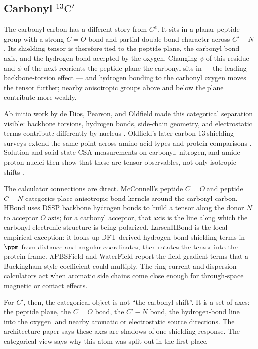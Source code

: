 \documentclass[11pt]{article}
\begin{document}
\subsection{\texorpdfstring{Carbonyl \(^{13}\mathrm C'\)}
{Carbonyl 13C-prime}}

The carbonyl carbon has a different story from \(C^\alpha\). It sits in a
planar peptide group with a strong \(C=O\) bond and partial double-bond
character across \(C'-N\). Its shielding tensor is therefore tied to the peptide
plane, the carbonyl bond axis, and the hydrogen bond accepted by the oxygen.
Changing \(\psi\) of this residue and \(\phi\) of the next reorients the
peptide plane the carbonyl sits in --- the leading backbone-torsion effect ---
and hydrogen bonding to the carbonyl oxygen moves the tensor further; nearby
anisotropic groups above and below the plane contribute more weakly.

Ab initio work by de Dios, Pearson, and Oldfield made this categorical
separation visible: backbone torsions, hydrogen bonds, side-chain geometry, and
electrostatic terms contribute differently by nucleus \cite{dedios1993}.
Oldfield's later carbon-13 shielding surveys extend the same point across amino
acid types and protein comparisons \cite{oldfield1995,sun2002}. Solution and
solid-state CSA measurements on carbonyl, nitrogen, and amide-proton nuclei
then show that these are tensor observables, not only isotropic shifts
\cite{loth2005}.

The calculator connections are direct. McConnell's peptide \(C=O\) and
peptide \(C-N\) categories place anisotropic bond kernels around the carbonyl
carbon. HBond uses DSSP backbone hydrogen bonds to build a tensor along the
donor \(N\) to acceptor \(O\) axis; for a carbonyl acceptor, that axis is the
line along which the carbonyl electronic structure is being polarized.
LarsenHBond is the local empirical exception: it looks up DFT-derived
hydrogen-bond shielding terms in \(\si{\ppm}\) from distance and angular
coordinates, then rotates the tensor into the protein frame. APBSField and
WaterField report the field-gradient terms that a Buckingham-style coefficient
could multiply. The ring-current and dispersion calculators act when aromatic
side chains come close enough for through-space magnetic or contact effects.

For \(C'\), then, the categorical object is not ``the carbonyl shift''. It is a
set of axes: the peptide plane, the \(C=O\) bond, the \(C'-N\) bond, the
hydrogen-bond line into the oxygen, and nearby aromatic or electrostatic source
directions. The architecture paper says these axes are shadows of one shielding
response. The categorical view says why this atom was split out in the first
place.
\end{document}
